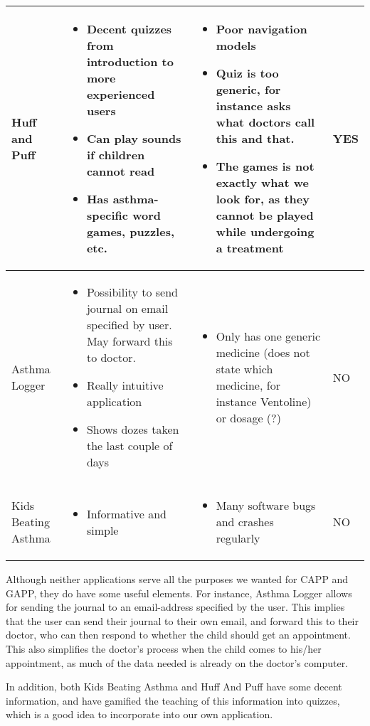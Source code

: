 \begin{center}
\begin{tabular}{ | p{2.5cm} | p{5cm} | p{5cm} | p{2cm}|}
	Huff and Puff & 
	\begin{itemize}
	  \item Decent quizzes from introduction to more experienced users
	  \item Can play sounds if children cannot read
	  \item Has asthma-specific word games, puzzles, etc.  
	\end{itemize}
	&
	\begin{itemize}
	  \item Poor navigation models
	  \item Quiz is too generic, for instance asks what doctors call this and that.
	  \item The games is not exactly what we look for, as they cannot be played while undergoing a treatment  
	\end{itemize}
	&
	YES
	\\ \hline
	Asthma Logger & 
	\begin{itemize}
	  \item Possibility to send journal on email specified by user. May forward this to doctor.  
	  \item Really intuitive application
	  \item Shows dozes taken the last couple of days
	\end{itemize}
	& 
	\begin{itemize}
	  \item Only has one generic medicine (does not state which medicine, for instance Ventoline) or dosage (?) 
	\end{itemize}
	& 
	NO
	\\ \hline
	Kids Beating Asthma
	& 
	\begin{itemize}
	  \item Informative and simple
	\end{itemize}
	&
	\begin{itemize}
	  \item Many software bugs and crashes regularly
	\end{itemize}
	& NO
	\\ \hline
	\end{tabular}
\end{center}



Although neither applications serve all the purposes we wanted for CAPP and GAPP, they do have some useful elements. For instance, Asthma Logger allows for sending the journal to an email-address specified by the user. This implies that the user can send their journal to their own email, and forward this to their doctor, who can then respond to whether the child should get an appointment. This also simplifies the doctor's process when the child comes to his/her appointment, as much of the data needed is already on the doctor's computer. 


In addition, both Kids Beating Asthma and Huff And Puff have some decent information, and have gamified the teaching of this information into quizzes, which is a good idea to incorporate into our own application.